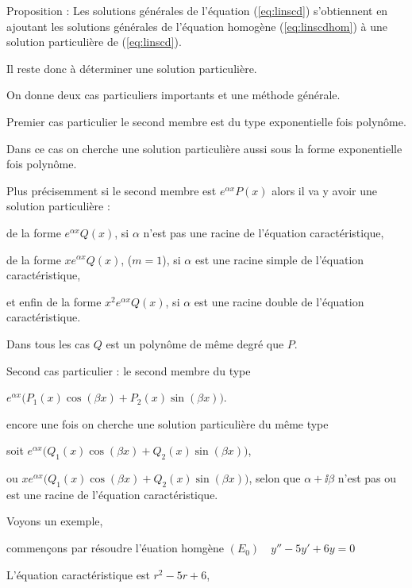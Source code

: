 Proposition : 
Les solutions générales de l'équation (\ref{eq:linscd}) s'obtiennent en
ajoutant les solutions générales de l'équation homogène (\ref{eq:linscdhom}) 
à une solution particulière de (\ref{eq:linscd}). 

Il reste donc à déterminer une solution particulière.


\diapo

On donne deux cas particuliers importants et une méthode générale.

\change
Premier cas particulier le second membre est du type 
exponentielle fois polynôme.

\change
Dans ce cas on cherche une solution particulière aussi sous la forme 
exponentielle fois polynôme.

\change
Plus précisemment si le second membre est $e^{\alpha x}P(x)$
alors il va y avoir une solution particulière :

\change
de la forme $e^{\alpha x}Q(x)$,  si $\alpha$ n'est pas 
une racine de l'équation caractéristique,

\change
de la forme $xe^{\alpha x}Q(x)$, ($m=1$), 
si $\alpha$ est une racine simple de l'équation caractéristique,

\change
et enfin de la forme 
$x^2e^{\alpha x}Q(x)$, si $\alpha$ est une 
racine double de l'équation caractéristique.

Dans tous les cas $Q$ est un polynôme de même degré que $P$.


\change
Second cas particulier : le second membre du type 

$e^{\alpha x}\big(P_1(x)\cos (\beta x)+P_2(x)\sin (\beta x)\big)$.

\change
encore une fois on cherche une solution particulière du même type

soit 
$e^{\alpha x} \big( Q_1(x)\cos (\beta x)+Q_2(x)\sin (\beta x) \big)$, 

\change
\change

ou $xe^{\alpha x}  \big( Q_1(x)\cos (\beta x)+Q_2(x)\sin (\beta x) \big)$, 
selon que 
$\alpha +\ii \beta$ n'est pas ou est une racine 
de l'équation caractéristique.


\diapo

Voyons un exemple,

commençons par résoudre l'éuation homgène 
$(E_0) \quad y''-5y'+6y=0$

\change
L'équation caractéristique est $r^2-5r+6$,

